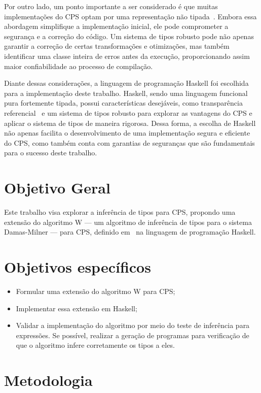 Por outro lado, um ponto importante a ser considerado é que muitas implementações do CPS optam por uma representação não tipada~\cite{MORRISSET1999}. Embora essa abordagem simplifique a implementação inicial, ele pode comprometer a segurança e a correção do código.
Um sistema de tipos robusto pode não apenas garantir a correção de certas transformações e otimizações, mas também identificar uma classe inteira de erros antes da execução, proporcionando assim maior confiabilidade ao processo de compilação.

Diante dessas considerações, a linguagem de programação Haskell foi escolhida para a implementação deste trabalho.
Haskell, sendo uma linguagem funcional pura fortemente tipada, possui características desejáveis, como transparência referencial~\cite{SONDERGAARD1990} e um sistema de tipos robusto para explorar as vantagens do CPS e aplicar o sistema de tipos de maneira rigorosa.
Dessa forma, a escolha de Haskell não apenas facilita o desenvolvimento de uma implementação segura e eficiente do CPS, como também conta com garantias de seguranças que são fundamentais para o sucesso deste trabalho.

\section{Objetivo Geral}\label{sec:objetivo-geral}

Este trabalho visa explorar a inferência de tipos para CPS, propondo uma extensão do algoritmo W --- um algoritmo de inferência de tipos para o sistema Damas-Milner --- para CPS, definido em~\cite{TORRENS2024} na linguagem de programação Haskell.

\section{Objetivos específicos}\label{sec:objetivos-especificos}

\begin{itemize}
  \item Formular uma extensão do algoritmo W para CPS;
  \item Implementar essa extensão em Haskell;
  \item Validar a implementação do algoritmo por meio do teste de inferência para expressões. Se possível, realizar a geração de programas para verificação de que o algoritmo infere corretamente os tipos a eles.
\end{itemize}

\section{Metodologia}\label{sec:metodologia}

